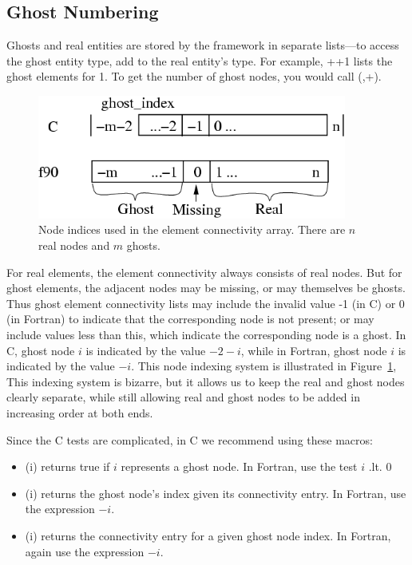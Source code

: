 \subsection{Ghost Numbering}
\label{sec:ghostnum}
Ghosts and real entities are stored by the framework
in separate lists---to access the ghost entity type, add 
to the real entity's type.  For example, ++1 
lists the ghost elements for  1.  To get the number 
of ghost nodes, you would call 
(,+).

\begin{figure}[h]
\begin{center}
\includegraphics[width=4in]{fig/conn_indexing}
\end{center}
\caption{Node indices used in the element connectivity array.
There are $n$ real nodes and $m$ ghosts.}
\label{fig:connindexing}
\end{figure}

For real elements, the element connectivity always consists of real nodes.
But for ghost elements, the adjacent nodes may be missing, or may themselves
be ghosts.
Thus ghost element connectivity lists may include the invalid 
value -1 (in C) or 0 (in Fortran) to indicate that the corresponding 
node is not present; or may include values
less than this, which indicate the corresponding node is a ghost.
In C, ghost node $i$ is indicated by the value $-2-i$, while
in Fortran, ghost node $i$ is indicated by the value $-i$.  
This node indexing system is illustrated in Figure~\ref{fig:connindexing}, 
This indexing system is bizarre, but it allows us to keep
the real and ghost nodes clearly separate, while still
allowing real and ghost nodes to be added in increasing order
at both ends.

Since the C tests are complicated, in C we recommend using these macros:

\begin{itemize}
\item {}(i) returns true if $i$ represents a ghost node.
In Fortran, use the test $i$ .lt. $0$

\item {}(i) returns the ghost node's index given its connectivity entry.
In Fortran, use the expression $-i$.

\item {}(i) returns the connectivity entry for a given ghost node index.
In Fortran, again use the expression $-i$.
\end{itemize}

